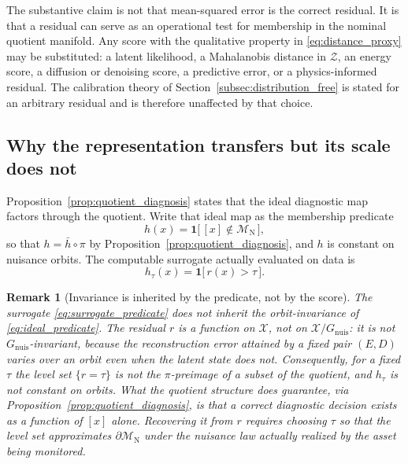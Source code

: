 \documentclass[a4paper]{cas-sc}
\newtheorem{remark}{Remark}
\newcommand{\X}{\ensuremath{\mathcal{X}}}
\newcommand{\Z}{\ensuremath{\mathcal{Z}}}
\newcommand{\Mnominal}{\ensuremath{\mathcal{M}_{\mathrm{N}}}}
\newcommand{\Gnuis}{\ensuremath{G_{\mathrm{nuis}}}}
\newcommand{\quotient}{\ensuremath{\mathcal{X}/G_{\mathrm{nuis}}}}
\newcommand{\residual}{\ensuremath{r}}
\newcommand{\indicator}{\ensuremath{\mathbf{1}}}
\begin{document}
The substantive claim is not that mean-squared error is the correct
residual. It is that a residual can serve as an operational test for
membership in the nominal quotient manifold. Any score with the qualitative
property in \eqref{eq:distance_proxy} may be substituted: a latent
likelihood, a Mahalanobis distance in \(\Z\), an energy score, a diffusion
or denoising score, a predictive error, or a physics-informed residual. The
calibration theory of
Section~\ref{subsec:distribution_free} is stated for an arbitrary residual
and is therefore unaffected by that choice.

\subsection{Why the representation transfers but its scale does not}
\label{subsec:scale_transfer}

Proposition~\ref{prop:quotient_diagnosis} states that the ideal diagnostic
map factors through the quotient. Write that ideal map as the membership
predicate
\begin{equation}
h(x) = \indicator\bigl[\,[x]\notin\Mnominal\,\bigr],
\label{eq:ideal_predicate}
\end{equation}
so that \(h=\bar h\circ\pi\) by Proposition~\ref{prop:quotient_diagnosis},
and \(h\) is constant on nuisance orbits. The computable surrogate actually
evaluated on data is
\begin{equation}
h_\tau(x) = \indicator\bigl[\,\residual(x) > \tau\,\bigr].
\label{eq:surrogate_predicate}
\end{equation}

\begin{remark}[Invariance is inherited by the predicate, not by the score]
\label{rem:scale_not_invariant}
The surrogate \eqref{eq:surrogate_predicate} does not inherit the
orbit-invariance of \eqref{eq:ideal_predicate}. The residual
\(\residual\) is a function on \(\X\), not on \(\quotient\): it is not
\(\Gnuis\)-invariant, because the reconstruction error attained by a fixed
pair \((E,D)\) varies over an orbit even when the latent state does not.
Consequently, for a fixed \(\tau\) the level set
\(\{\residual = \tau\}\) is not the \(\pi\)-preimage of a subset of the
quotient, and \(h_\tau\) is not constant on orbits. What the quotient
structure does guarantee, via
Proposition~\ref{prop:quotient_diagnosis}, is that a \emph{correct}
diagnostic decision exists as a function of \([x]\) alone. Recovering it
from \(\residual\) requires choosing \(\tau\) so that the level set
approximates \(\partial\Mnominal\) under the nuisance law actually realized
by the asset being monitored.
\end{remark}
\end{document}
